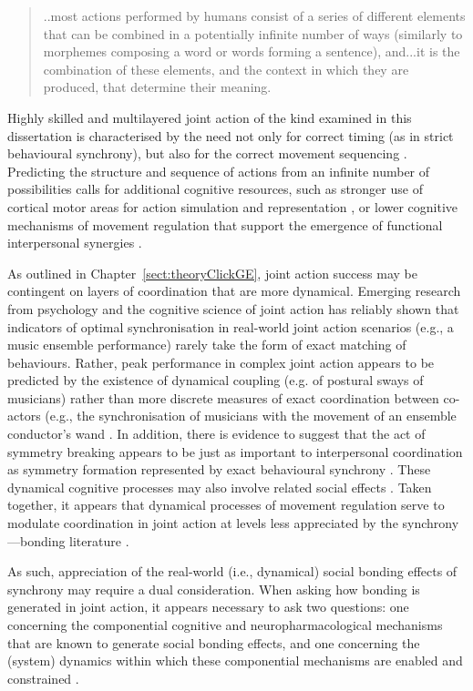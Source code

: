 \begin{quote}
    ..most actions performed by humans consist of a series of different elements that can be combined in a potentially infinite number of ways (similarly to morphemes composing a word or words forming a sentence), and...it is the combination of these elements, and the context in which they are produced, that determine their meaning.
\end{quote}

Highly skilled and multilayered joint action of the kind examined in this dissertation is characterised by the need not only for correct timing (as in strict behavioural synchrony), but also for the correct movement sequencing \citep{Palmer2003}.  Predicting the structure and sequence of actions from an infinite number of possibilities calls for additional cognitive resources, such as stronger use of cortical motor areas for action simulation and representation \citep{Bekkering2009}, or lower cognitive mechanisms of movement regulation that support the emergence of functional interpersonal synergies \citep{Riley2011}.

As outlined in Chapter~\ref{sect:theoryClickGE}, joint action success may be contingent on layers of coordination that are more dynamical.  Emerging research from psychology and the cognitive science of joint action has reliably shown that indicators of optimal synchronisation in real-world joint action scenarios (e.g., a music ensemble performance) rarely take the form of exact matching of behaviours.  Rather, peak performance in complex joint action appears to be predicted by the existence of dynamical coupling (e.g. of postural sways of musicians) rather than more discrete measures of exact coordination between co-actors (e.g., the synchronisation of musicians with the movement of an ensemble conductor's wand \citep{Miyata2017}. In addition, there is evidence to suggest that the act of symmetry breaking appears to be just as important to interpersonal coordination as symmetry formation represented by exact behavioural synchrony \citep{Richardson2015}.  These dynamical cognitive processes may also involve related social effects \citep{Marsh2009}.  Taken together, it appears that dynamical processes of movement regulation serve to modulate coordination in joint action at levels less appreciated by the synchrony—bonding literature \citep{Launay2016}.

As such, appreciation of the real-world (i.e., dynamical) social bonding effects of synchrony may require a dual consideration.   When asking how bonding is generated in joint action, it appears necessary to ask two questions:
one concerning the componential cognitive and neuropharmacological mechanisms that are known to generate social bonding effects, and one concerning the (system) dynamics within which these componential mechanisms are enabled and constrained \citep{Coey2012}.

